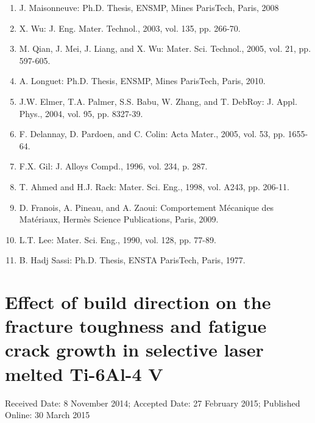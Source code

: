 \documentclass[10pt]{article}
\begin{document}
\begin{enumerate}
  \item J. Maisonneuve: Ph.D. Thesis, ENSMP, Mines ParisTech, Paris, 2008

  \item X. Wu: J. Eng. Mater. Technol., 2003, vol. 135, pp. 266-70.

  \item M. Qian, J. Mei, J. Liang, and X. Wu: Mater. Sci. Technol., 2005, vol. 21, pp. 597-605.

  \item A. Longuet: Ph.D. Thesis, ENSMP, Mines ParisTech, Paris, 2010.

  \item J.W. Elmer, T.A. Palmer, S.S. Babu, W. Zhang, and T. DebRoy: J. Appl. Phys., 2004, vol. 95, pp. 8327-39.

  \item F. Delannay, D. Pardoen, and C. Colin: Acta Mater., 2005, vol. 53, pp. 1655-64.

  \item F.X. Gil: J. Alloys Compd., 1996, vol. 234, p. 287.

  \item T. Ahmed and H.J. Rack: Mater. Sci. Eng., 1998, vol. A243, pp. 206-11.

  \item D. Franois, A. Pineau, and A. Zaoui: Comportement Mécanique des Matériaux, Hermès Science Publications, Paris, 2009.

  \item L.T. Lee: Mater. Sci. Eng., 1990, vol. 128, pp. 77-89.

  \item B. Hadj Sassi: Ph.D. Thesis, ENSTA ParisTech, Paris, 1977.

\end{enumerate}

\section*{Effect of build direction on the fracture toughness and fatigue crack growth in selective laser melted Ti-6Al-4 V }
Received Date: 8 November 2014; Accepted Date: 27 February 2015; Published Online: 30 March 2015
\end{document}
